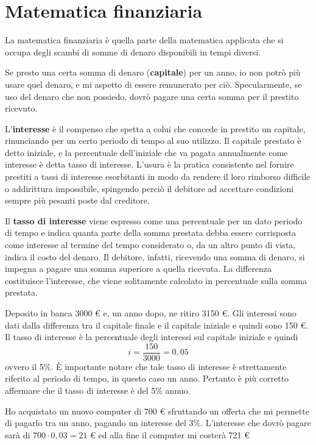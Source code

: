 
\chapter{Matematica finanziaria}

La matematica finanziaria è quella parte della matematica applicata che si 
occupa degli scambi di somme di denaro disponibili in tempi diversi.

Se presto una certa somma di denaro (\textbf{capitale}) per un anno, io non 
potrò più usare quel denaro, e mi aspetto di essere remunerato per ciò. 
Specularmente, se uso del denaro che non possiedo, dovrò pagare una certa somma 
per il prestito ricevuto. 

L'\textbf{interesse} è il compenso che spetta a colui che concede in prestito 
un capitale, rinunciando per un certo periodo di tempo al suo utilizzo. Il 
capitale prestato è detto iniziale, e la percentuale dell'iniziale che va 
pagata annualmente come interesse è detta tasso di interesse. L'usura è la 
pratica consistente nel fornire prestiti a tassi di interesse esorbitanti in 
modo da rendere il loro rimborso difficile o addirittura impossibile, spingendo 
perciò il debitore ad accettare condizioni sempre più pesanti poste dal 
creditore.

Il \textbf{tasso di interesse} viene espresso come una percentuale per un dato 
periodo di tempo e indica quanta parte della somma prestata debba essere 
corrisposta come interesse al termine del tempo considerato o, da un altro 
punto di vista, indica il costo del denaro. Il debitore, infatti, ricevendo una 
somma di denaro, si impegna a pagare una somma superiore a quella ricevuta. La 
differenza costituisce l'interesse, che viene solitamente calcolato in 
percentuale sulla somma prestata.

\begin{exrig}
\begin{esempio}
Deposito in banca 3000 € e, un anno dopo, ne ritiro 3150 €. Gli interessi sono 
dati dalla differenza tra il capitale finale e il capitale iniziale e quindi 
sono 150 €. Il tasso di interesse è la percentuale degli interessi sul capitale 
iniziale e quindi
$$ i = \dfrac{150}{3000} = 0,05 $$
ovvero il 5\%. \`{E} importante notare che tale tasso di interesse è 
strettamente riferito al periodo di tempo, in questo caso un anno. Pertanto è 
più corretto affermare che il tasso di interesse è del 5\% annuo. 
\end{esempio}

\begin{esempio}
Ho acquistato un nuovo computer di 700 € sfruttando un offerta che mi permette 
di pagarlo tra un anno, pagando un interesse del 3\%.
L'interesse che dovrò pagare sarà di $700 \cdot 0,03 = 21$ € ed alla fine il 
computer mi costerà 721 €
\end{esempio}

\end{exrig}

